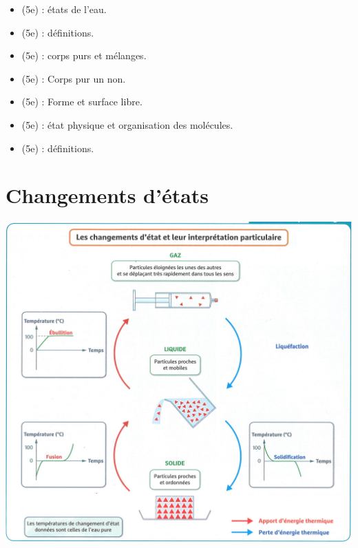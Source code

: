 \documentclass[12pt,a4paper]{article}
\begin{document}
\begin{myexos}
	\begin{itemize}
		\item {} (5e) : états de l'eau.
		\item {} (5e) : définitions.
		\item {} (5e) : corps purs et mélanges.
		\item {} (5e) : Corps pur un non.
		\item {} (5e) : Forme et surface libre.
		\item {} (5e) : état physique et organisation des molécules.
		\item {} (5e) : définitions.
	\end{itemize}
\end{myexos}

\section{Changements d'états}





\begin{center}
	\includegraphics[scale=0.7]{chgmt_etats}
\end{center}
\end{document}
